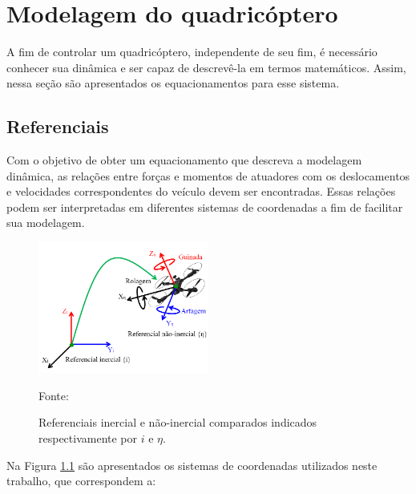 \documentclass[main.tex]{subfiles}
\begin{document}
\chapter{Modelagem do quadricóptero}
\label{chap:modelagem}


A fim de controlar um quadricóptero, independente de seu fim, é necessário conhecer sua dinâmica e ser capaz de descrevê-la em termos matemáticos. Assim, nessa seção são apresentados os equacionamentos para esse sistema.

\section{Referenciais}


Com o objetivo de obter um equacionamento que descreva a modelagem dinâmica, as relações entre forças e momentos de atuadores com os deslocamentos e velocidades correspondentes do veículo devem ser encontradas. Essas relações podem ser interpretadas em diferentes sistemas de coordenadas a fim de facilitar sua modelagem. 

\begin{figure}[!h]
	\centering
	\caption{Referenciais inercial e não-inercial comparados indicados respectivamente por $i$ e $\eta$.}
	\includegraphics[width=0.5\textwidth]{capitulos/modelagem/imgs/referenciais.png}
	\label{fig:referenciais}
	\begin{flushleft}
		\small{Fonte: \cite{imagem_referenciais}}
	\end{flushleft}
\end{figure}

Na Figura \ref{fig:referenciais} são apresentados os sistemas de coordenadas utilizados neste trabalho, que correspondem a:
\end{document}

